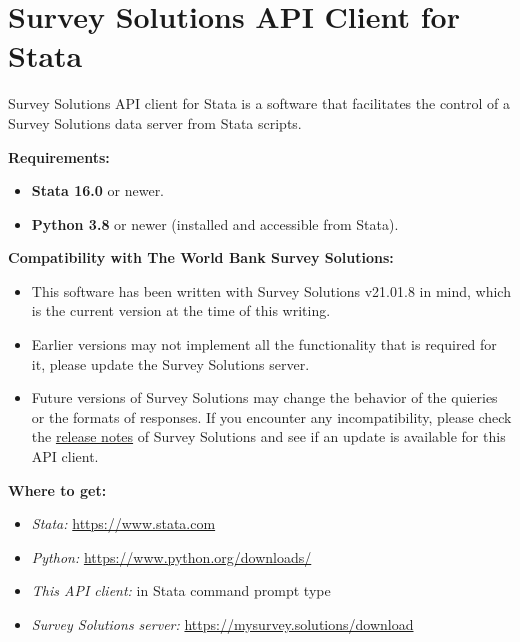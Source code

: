 \section{Survey Solutions API Client for Stata}

\vskip16pt
Survey Solutions API client for Stata is a software that facilitates the
control of a Survey Solutions data server from Stata scripts.

\vskip16pt
\textbf{Requirements:}
\begin{itemize}
    \item \textbf{Stata 16.0} or newer.
    \item \textbf{Python 3.8} or newer (installed and accessible from Stata).
\end{itemize}

\vskip16pt
\textbf{Compatibility with The World Bank Survey Solutions:}
\begin{itemize}
  \item This software has been written with Survey Solutions v21.01.8 in mind,
        which is the current version at the time of this writing.
  \item Earlier versions may not implement all the functionality that is
        required for it, please update the Survey Solutions server.
  \item Future versions of Survey Solutions may change the behavior of the
        quieries or the formats of responses. If you encounter any
        incompatibility, please check the \href{https://docs.mysurvey.solutions/release_notes}{release notes} of Survey Solutions
        and see if an update is available for this API client.
\end{itemize}

\vskip16pt
\textbf{Where to get:}
\begin{itemize}
  \item \textit{Stata:} \href{https://www.stata.com}{https://www.stata.com}
  \item \textit{Python:} \href{https://www.python.org/downloads/}{https://www.python.org/downloads/}
  \item \textit{This API client:} in Stata command prompt type 
  \item \textit{Survey Solutions server:} \href{https://mysurvey.solutions/download}{https://mysurvey.solutions/download}
\end{itemize}



